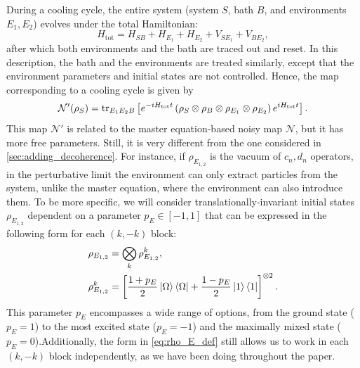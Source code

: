 During a cooling cycle, the entire system (system $S$, bath $B$, and environments $E_1, E_2$) evolves under the total Hamiltonian:
\begin{equation}
    H_{\text{tot}} = H_{SB} + H_{E_1} + H_{E_2} + V_{SE_1} + V_{BE_2},
    \label{eq:H_tot}
\end{equation}
after which both environments and the bath are traced out and reset. In this description, the bath and the environments are treated similarly, except that the environment parameters and initial states are not controlled. Hence, the map corresponding to a cooling cycle is given by
\begin{equation}
    \mathcal{N}'(\rho_S) = \operatorname{tr}_{E_1 E_2 B}\left[e^{-iH_\text{tot}t}\left(\rho_S \otimes \rho_B\otimes \rho_{E_1}\otimes\rho_{E_2}\right)e^{i H_\text{tot}t}\right].
    \label{eq:cooling_mapdiss}
\end{equation}
This map $\mathcal{N}'$ is related to the master equation-based noisy map $\mathcal{N}$, but it has more free parameters.
Still, it is very different from the one considered in \cref{sec:adding_decoherence}. For instance, if $\rho_{E_{1,2}}$ is the vacuum of $c_n, d_n$ operators, in the perturbative limit the environment can only extract particles from the system, unlike the master equation, where the environment can also introduce them.
To be more specific, we will consider translationally-invariant initial states $\rho_{E_{1,2}}$ dependent on a parameter $p_E\in[-1,1]$ that can be expressed in the following form for each $(k,-k)$ block:
\begin{align}
    \rho_{E_{1,2}}   &=\bigotimes_k\rho_{E_{1,2}}^k,\\
    \rho_{E_{1,2}}^k &=\left[\frac{1+p_E}{2}\ket{\Omega}\bra{\Omega}+\frac{1-p_E}{2}\ket{1}\bra{1}\right]^{\otimes2}.
    \label{eq:rho_E_def}
\end{align}
This parameter $p_E$ encompasses a wide range of options, from the ground state ($p_E=1$) to the most excited state ($p_E=-1$) and the maximally mixed state ($p_E=0$).Additionally, the form in \cref{eq:rho_E_def}  still allows us to work in each $(k,-k)$ block independently, as we have been doing throughout the paper.


